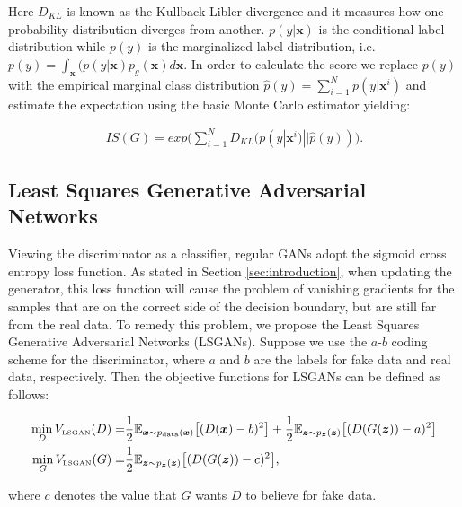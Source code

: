 Here $D_{KL}$ is known as the Kullback Libler divergence and it measures how one probability distribution diverges from another.  $p(y|\bm{x})$ is the conditional label distribution while $p(y)$ is the  marginalized label distribution, i.e. $p(y)=\int_{\bm{x}} (p(y|\bm{x})p_g(\bm{x}) d\bm{x}$. In order to calculate the score we replace $p(y)$ with the empirical marginal class distribution $\hat{p}(y) = \sum^N_{i=1} p(y|\bm{x}^i)$ and estimate the expectation using the basic Monte Carlo estimator yielding:

\begin{equation}
\label{eq_IS2}
\begin{split}
IS(G) = exp\big(\sum^N_{i=1}D_{KL}(p(y|\bm{x}^i)||\hat{p}(y))\big).
\end{split}
\end{equation}


\subsection{Least Squares Generative Adversarial Networks}
Viewing the discriminator as a classifier, regular GANs adopt the sigmoid cross entropy loss function. As stated in Section \ref{sec:introduction}, when updating the generator, this loss function will cause the problem of vanishing gradients for the samples that are on the correct side of the decision boundary, but are still far from the real data. To remedy this problem, we propose the Least Squares Generative Adversarial Networks (LSGANs). Suppose we use the $a$-$b$ coding scheme for the discriminator, where $a$ and $b$ are the labels for fake data and real data,  respectively. Then the objective functions for LSGANs can be defined as follows:

\begin{equation}
\label{eq:lsgan}
\begin{split}
\min_D V_{\text{\tiny LSGAN}}(D) = &\frac{1}{2}\mathbb{E}_{\bm{x} \sim p_{\text{data}}(\bm{x})}\bigl[(D(\bm{x})-b)^2\bigr]+ \frac{1}{2}\mathbb{E}_{\bm{z} \sim p_{\bm{z}}(\bm{z})}\bigl[(D(G(\bm{z}))-a)^2\bigr] \\
\min_G V_{\text{\tiny LSGAN}}(G) = &\frac{1}{2}\mathbb{E}_{\bm{z} \sim p_{\bm{z}}(\bm{z})}\bigl[(D(G(\bm{z}))-c)^2\bigr],
\end{split}
\end{equation}


where $c$ denotes the value that $G$ wants $D$ to believe for fake data.


